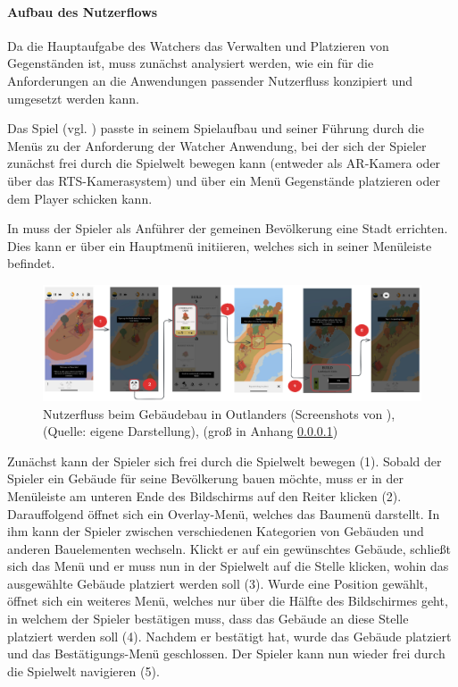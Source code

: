 \paragraph{Aufbau des Nutzerflows}
Da die Hauptaufgabe des Watchers das Verwalten und Platzieren von Gegenständen ist, muss zunächst analysiert werden, wie ein für die Anforderungen an die Anwendungen passender Nutzerfluss konzipiert und umgesetzt werden kann.

Das Spiel  (vgl. \cite{noauthor_outlanders_2025}) passte in seinem Spielaufbau und seiner Führung durch die Menüs zu der Anforderung der Watcher Anwendung, bei der sich der Spieler zunächst frei durch die Spielwelt bewegen kann (entweder als \ac{AR}-Kamera oder über das RTS-Kamerasystem) und über ein Menü Gegenstände platzieren oder dem Player schicken kann.

In  muss der Spieler als Anführer der gemeinen Bevölkerung eine Stadt errichten. Dies kann er über ein Hauptmenü initiieren, welches sich in seiner Menüleiste befindet.

\begin{figure}[ht]
\centering
\includegraphics[width=1\linewidth]{content/pictures/Nutzerflow.png}
\caption{Nutzerfluss beim Gebäudebau in Outlanders (Screenshots von \cite{coates_game_nodate}), (Quelle: eigene Darstellung), (groß in Anhang \ref{})}
\label{fig:userflow-outlanders-build}
\end{figure}

Zunächst kann der Spieler sich frei durch die Spielwelt bewegen (1). Sobald der Spieler ein Gebäude für seine Bevölkerung bauen möchte, muss er in der Menüleiste am unteren Ende des Bildschirms auf den Reiter  klicken (2). Darauffolgend öffnet sich ein Overlay-Menü, welches das Baumenü darstellt. In ihm kann der Spieler zwischen verschiedenen Kategorien von Gebäuden und anderen Bauelementen wechseln. Klickt er auf ein gewünschtes Gebäude, schließt sich das Menü und er muss nun in der Spielwelt auf die Stelle klicken, wohin das ausgewählte Gebäude platziert werden soll (3). Wurde eine Position gewählt, öffnet sich ein weiteres Menü, welches nur über die Hälfte des Bildschirmes geht, in welchem der Spieler bestätigen muss, dass das Gebäude an diese Stelle platziert werden soll (4). Nachdem er bestätigt hat, wurde das Gebäude platziert und das Bestätigungs-Menü geschlossen. Der Spieler kann nun wieder frei durch die Spielwelt navigieren (5).

